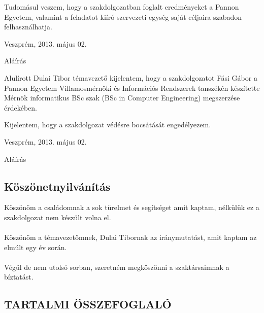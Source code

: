 \documentclass[a4paper,12pt,oneside]{report}
\begin{document}
Tudomásul veszem, hogy a szakdolgozatban foglalt eredményeket a Pannon Egyetem, valamint a feladatot kiíró szervezeti egység saját céljaira szabadon felhasználhatja.\\

\begin{flushleft}
{Veszprém, 2013. május 02.\\}
\end{flushleft}

\begin{flushright}
{Aláírás \vspace{4cm}}
\end{flushright}

Alulírott Dulai Tibor témavezető kijelentem, hogy a szakdolgozatot Fási Gábor a Pannon Egyetem Villamosmérnöki és Információs Rendszerek tanszékén készítette Mérnök informatikus BSc szak (BSc in Computer Engineering) megszerzése érdekében.

Kijelentem, hogy a szakdolgozat védésre bocsátását engedélyezem.\\

\begin{flushleft}
{Veszprém, 2013. május 02.\\}
\end{flushleft}

\begin{flushright}
{Aláírás}
\end{flushright}
\newpage
\pagebreak
\begin{center}
\section*{Köszönetnyilvánítás}
\end{center}

Köszönöm a családomnak a sok türelmet és segítséget amit kaptam, nélkülük ez a szakdolgozat nem készült volna el.
\\
\\
Köszönöm a témavezetőmnek, Dulai Tibornak az iránymutatást, amit kaptam az elmúlt egy év során.
\\
\\
Végül de nem utolsó sorban, szeretném megköszönni a szaktársaimnak a bíztatást.

\newpage

\begin{center}
\section*{\textbf{\Large \MakeUppercase{Tartalmi összefoglaló}}}
\end{center}
\end{document}
